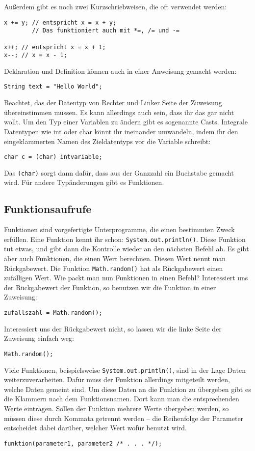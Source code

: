 Außerdem gibt es noch zwei Kurzschriebweisen, die oft verwendet werden:
\begin{lstlisting}
x += y; // entspricht x = x + y;
        // Das funktioniert auch mit *=, /= und -=

x++; // entspricht x = x + 1;
x--; // x = x - 1;
\end{lstlisting}
Deklaration und Definition können auch in einer Anweisung gemacht werden: 
\begin{lstlisting}
String text = "Hello World";
\end{lstlisting}
Beachtet, das der Datentyp von Rechter und Linker Seite der Zuweisung übereinstimmen müssen. Es kann allerdings auch sein, dass ihr das gar nicht wollt.
Um den Typ einer Variablen zu ändern gibt es sogenannte Casts. Integrale Datentypen wie int oder char könnt ihr ineinander umwandeln, indem ihr den eingeklammerten Namen des Zieldatentyps vor die Variable schreibt: 
\begin{lstlisting}
char c = (char) intvariable;
\end{lstlisting}
Das \lstinline$(char)$ sorgt dann dafür, dass aus der Ganzzahl ein Buchstabe gemacht wird.
Für andere Typänderungen gibt es Funktionen.

\subsection{Funktionsaufrufe}
Funktionen sind vorgefertigte Unterprogramme, die einen bestimmten Zweck erfüllen. Eine Funktion kennt ihr schon: \lstinline$System.out.println()$.
Diese Funktion tut etwas, und gibt dann die Kontrolle wieder an den nächsten Befehl ab. Es gibt aber auch Funktionen, die einen Wert berechnen.
Diesen Wert nennt man Rückgabewert. Die Funktion \lstinline$Math.random()$ hat als Rückgabewert einen zufälligen Wert.
Wie packt man nun Funktionen in einen Befehl? Interessiert uns der Rückgabewert der Funktion, so benutzen wir die Funktion in einer Zuweisung: 
\begin{lstlisting}
zufallszahl = Math.random();
\end{lstlisting}
Interessiert uns der Rückgabewert nicht, so lassen wir die linke Seite der Zuweisung einfach weg:
\begin{lstlisting}
Math.random();
\end{lstlisting}
Viele Funktionen, beispielsweise \lstinline$System.out.println()$, sind in der Lage Daten weiterzuverarbeiten. Dafür muss der Funktion allerdings mitgeteilt werden, welche Daten gemeint sind.
Um diese Daten an die Funktion zu übergeben gibt es die Klammern nach dem Funktionsnamen. Dort kann man die entsprechenden Werte eintragen.
Sollen der Funktion mehrere Werte übergeben werden, so müssen diese durch Kommata getrennt werden – die Reihenfolge der Parameter entscheidet dabei darüber, welcher Wert wofür benutzt wird.
\begin{lstlisting}
funktion(parameter1, parameter2 /* . . . */);
\end{lstlisting}

